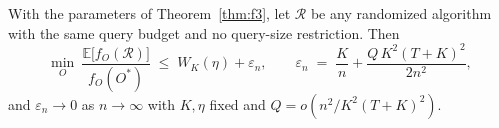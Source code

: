 \begin{corollary}\label{cor:f3-rand}
With the parameters of Theorem~\ref{thm:f3}, let $\mathcal R$ be any randomized
algorithm with the same query budget and no query-size restriction.  Then
\[
  \min_{O}\ \frac{\mathbb E\bigl[f_O(\mathcal R)\bigr]}{f_O(O^{\ast})}
  \;\le\;W_K(\eta)+\varepsilon_n,
  \qquad
  \varepsilon_n\;=\;\frac{K}{n}+\frac{Q\,K^{2}(T+K)^{2}}{2n^{2}},
\]
and $\varepsilon_n\to0$ as $n\to\infty$ with $K,\eta$ fixed and
$Q=o(n^{2}/K^{2}(T+K)^{2})$.
\end{corollary}

